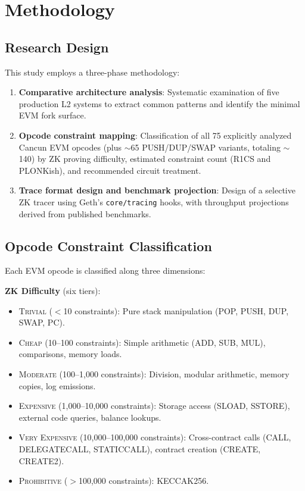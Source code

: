 
\section{Methodology}

\subsection{Research Design}

This study employs a three-phase methodology:

\begin{enumerate}
  \item \textbf{Comparative architecture analysis}: Systematic examination of
    five production L2 systems to extract common patterns and identify the
    minimal EVM fork surface.
  \item \textbf{Opcode constraint mapping}: Classification of all 75 explicitly
    analyzed Cancun EVM opcodes (plus ${\sim}$65 PUSH/DUP/SWAP variants, totaling
    ${\sim}$140) by ZK proving difficulty, estimated constraint count (R1CS and
    PLONKish), and recommended circuit treatment.
  \item \textbf{Trace format design and benchmark projection}: Design of a
    selective ZK tracer using Geth's \texttt{core/tracing} hooks, with throughput
    projections derived from published benchmarks.
\end{enumerate}

\subsection{Opcode Constraint Classification}

Each EVM opcode is classified along three dimensions:

\textbf{ZK Difficulty} (six tiers):
\begin{itemize}
  \item \textsc{Trivial} ($<$10 constraints): Pure stack manipulation (POP, PUSH,
    DUP, SWAP, PC).
  \item \textsc{Cheap} (10--100 constraints): Simple arithmetic (ADD, SUB, MUL),
    comparisons, memory loads.
  \item \textsc{Moderate} (100--1{,}000 constraints): Division, modular
    arithmetic, memory copies, log emissions.
  \item \textsc{Expensive} (1{,}000--10{,}000 constraints): Storage access
    (SLOAD, SSTORE), external code queries, balance lookups.
  \item \textsc{Very Expensive} (10{,}000--100{,}000 constraints): Cross-contract
    calls (CALL, DELEGATECALL, STATICCALL), contract creation (CREATE, CREATE2).
  \item \textsc{Prohibitive} ($>$100{,}000 constraints): KECCAK256.
\end{itemize}

